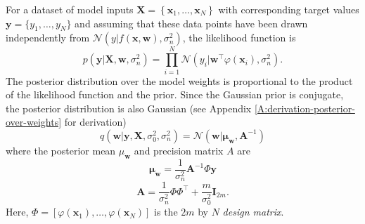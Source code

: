 For a dataset of model inputs $\mathbf{X}=\left\{\mathbf{x}_{1}, \dots, \mathbf{x}_{N}\right\}$ with corresponding target values $\mathbf{y}=\{y_{1}, \dots, y_{N}\}$ and assuming that these data points have been drawn independently from $\mathcal{N}(y|f(\mathbf{x}, \mathbf{w}), \sigma^{2}_{n})$, the likelihood function is
\begin{equation}
    p(\mathbf{y} | \mathbf{X}, \mathbf{w}, \sigma^{2}_{n})=\prod_{i=1}^{N} \mathcal{N}\left(y_{i} | \mathbf{w}^{\top} \varphi\left(\mathbf{x}_{i}\right), \sigma^{2}_{n}\right).
\end{equation}
The posterior distribution over the model weights is proportional to the product of the likelihood function and the prior. Since the Gaussian prior is conjugate, the posterior distribution is also Gaussian (see Appendix \ref{A:derivation-posterior-over-weights} for derivation)
\begin{equation}
    q(\mathbf{w} | \mathbf{y}, \mathbf{X}, \sigma_{0}^{2}, \sigma_{n}^{2})=\mathcal{N}\left(\mathbf{w} | \mathbf{\mu_{\mathbf{w}}}, \mathbf{A}^{-1}\right)
    \label{Eq:Model-posterior-over-weights}
\end{equation}
where the posterior mean $\mu_{\mathbf{w}}$ and precision matrix $A$ are
\begin{equation}
    \mathbf{\mu_{\mathbf{w}}}=\frac{1}{\sigma_{n}^{2}} \mathbf{A}^{-1} \Phi \mathbf{y}
\end{equation}
\begin{equation}
    \mathbf{A} =\frac{1}{\sigma_{n}^{2}} \Phi \Phi^{\top} + \frac{m}{\sigma_{0}^{2}} \mathbf{I}_{2m}.
\end{equation}
Here, $\Phi = \left[\varphi(\mathbf{x}_{1}), \dots , \varphi(\mathbf{x}_{N})\right]$ is the $2m$ by $N$ \textit{design matrix}.

